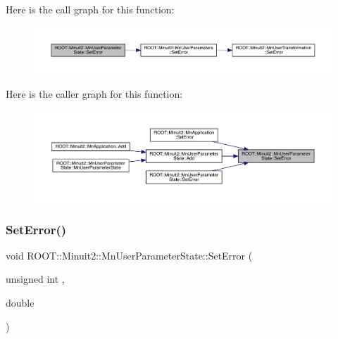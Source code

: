 Here is the call graph for this function\+:
\nopagebreak
\begin{figure}[H]
\begin{center}
\leavevmode
\includegraphics[width=350pt]{d3/de0/classROOT_1_1Minuit2_1_1MnUserParameterState_adf2a80e9887b97dcc01b65184281aaa5_cgraph}
\end{center}
\end{figure}
Here is the caller graph for this function\+:
\nopagebreak
\begin{figure}[H]
\begin{center}
\leavevmode
\includegraphics[width=350pt]{d3/de0/classROOT_1_1Minuit2_1_1MnUserParameterState_adf2a80e9887b97dcc01b65184281aaa5_icgraph}
\end{center}
\end{figure}
\mbox{\label{classROOT_1_1Minuit2_1_1MnUserParameterState_adf2a80e9887b97dcc01b65184281aaa5}} 
\subsubsection{\texorpdfstring{SetError()}{SetError()}\hspace{0.1cm}{\footnotesize\ttfamily [2/6]}}
{\footnotesize\ttfamily void R\+O\+O\+T\+::\+Minuit2\+::\+Mn\+User\+Parameter\+State\+::\+Set\+Error (\begin{DoxyParamCaption}\item[{unsigned int}]{,  }\item[{double}]{ }\end{DoxyParamCaption})}

\mbox{\label{classROOT_1_1Minuit2_1_1MnUserParameterState_adf2a80e9887b97dcc01b65184281aaa5}} 
